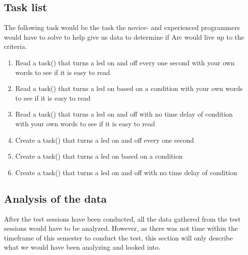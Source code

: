 \subsection{Task list}\label{subsubsec:taskList}
The following task would be the task the novice- and experienced programmers would have to solve to help give us data to determine if Arc would live up to the criteria.
\begin{enumerate} %
    \item Read a task() that turns a led on and off every one second with your own words to see if it is easy to read
    \item Read a task() that turns a led on based on a condition with your own words to see if it is easy to read
    \item Read a task() that turns a led on and off with no time delay of condition with your own words to see if it is easy to read
    \item Create a task() that turns a led on and off every one second
    \item Create a task() that turns a led on based on a condition
    \item Create a task() that turns a led on and off with no time delay of condition
\end{enumerate}

\subsection{Analysis of the data}\label{subsubsec:analysisOfTheData}
After the test sessions have been conducted, all the data gathered from the test sessions would have to be analyzed. However, as there was not time within the timeframe of this semester to conduct the test, this section will only describe what we would have been analyzing and looked into.





